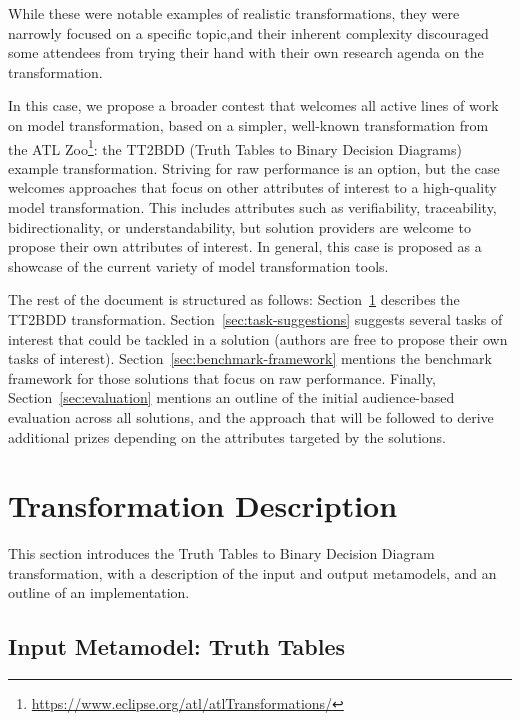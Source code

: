 \documentclass[a4paper]{scrartcl}
\begin{document}
While these were notable examples of realistic transformations, they were
narrowly focused on a specific topic,and their inherent complexity discouraged
some attendees from trying their hand with their own research agenda on the
transformation.

In this case, we propose a broader contest that welcomes all active lines of
work on model transformation, based on a simpler, well-known transformation from
the ATL Zoo\footnote{\url{https://www.eclipse.org/atl/atlTransformations/}}: the
TT2BDD (Truth Tables to Binary Decision Diagrams) example transformation.
Striving for raw performance is an option, but the case welcomes approaches that
focus on other attributes of interest to a high-quality model transformation.
This includes attributes such as verifiability, traceability, bidirectionality,
or understandability, but solution providers are welcome to propose their own
attributes of interest. In general, this case is proposed as a showcase of the
current variety of model transformation tools.

The rest of the document is structured as follows:
Section~\ref{sec:transf-descr} describes the TT2BDD transformation.
Section~\ref{sec:task-suggestions} suggests several tasks of interest that could
be tackled in a solution (authors are free to propose their own tasks of
interest). Section~\ref{sec:benchmark-framework} mentions the benchmark
framework for those solutions that focus on raw performance. Finally,
Section~\ref{sec:evaluation} mentions an outline of the initial audience-based
evaluation across all solutions, and the approach that will be followed to
derive additional prizes depending on the attributes targeted by the solutions.

\section{Transformation Description}
\label{sec:transf-descr}

This section introduces the Truth Tables to Binary Decision Diagram
transformation, with a description of the input and output metamodels, and an
outline of an implementation.

\subsection{Input Metamodel: Truth Tables}
\label{sec:input-metam-truth}
\end{document}
